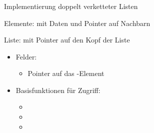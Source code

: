 \begin{frame}
\frametitle{\insertsection}
\begin{block}
{Implementierung doppelt verketteter Listen}
\end{block}
\vspace{-1em}
\begin{block}
{Elemente:  mit Daten und Pointer auf Nachbarn}
\end{block}
\vspace{-1em}
\begin{block}
{Liste:  mit Pointer auf den Kopf der Liste}
\begin{itemize}
	\item Felder:
	\begin{itemize}
		\item Pointer auf das -Element
	\end{itemize}
	\item<2-> Basisfunktionen für Zugriff:
	\begin{itemize}
		\item {}
		\item {}
		\item {}
	\end{itemize}
\end{itemize}
\end{block}
\end{frame}